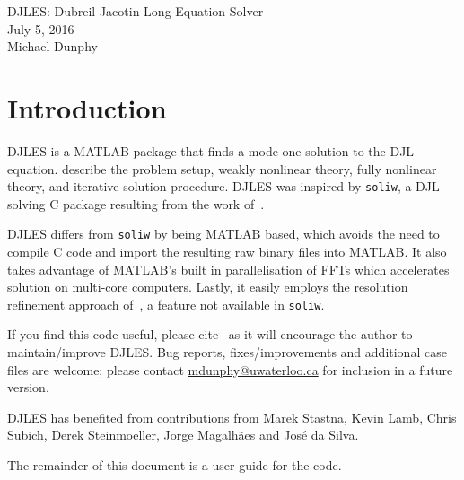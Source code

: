 \documentclass[letterpaper]{article}
\begin{document}
\newpage
\pagestyle{plain}
\setcounter{page}{1}

\begin{center}
\huge{DJLES: Dubreil-Jacotin-Long Equation Solver}\\[1em]
\large{July 5, 2016}\\
Michael Dunphy
\end{center}

\section{Introduction}
DJLES is a MATLAB package that finds a mode-one solution to the DJL equation. \cite{StastnaLamb2002} describe the problem setup, weakly nonlinear theory, fully nonlinear theory, and iterative solution procedure. DJLES was inspired by \verb+soliw+, a DJL solving C package resulting from the work of~\cite{StastnaLamb2002}.

DJLES differs from \verb+soliw+ by being MATLAB based, which avoids the need to compile C code and import the resulting raw binary files into MATLAB. It also takes advantage of MATLAB's built in parallelisation of FFTs which accelerates solution on multi-core computers. Lastly, it easily employs the resolution refinement approach of~\cite{DunphySubichStastna2011}, a feature not available in \verb+soliw+.

If you find this code useful, please cite~\cite{DunphySubichStastna2011} as it will encourage the author to maintain/improve DJLES. Bug reports, fixes/improvements and additional case files are welcome; please contact \href{mailto:mdunphy@uwaterloo.ca}{mdunphy@uwaterloo.ca} for inclusion in a future version.

DJLES has benefited from contributions from Marek Stastna, Kevin Lamb, Chris Subich, Derek Steinmoeller, Jorge Magalh\~aes and Jos\'e da Silva.

The remainder of this document is a user guide for the code.
\end{document}
